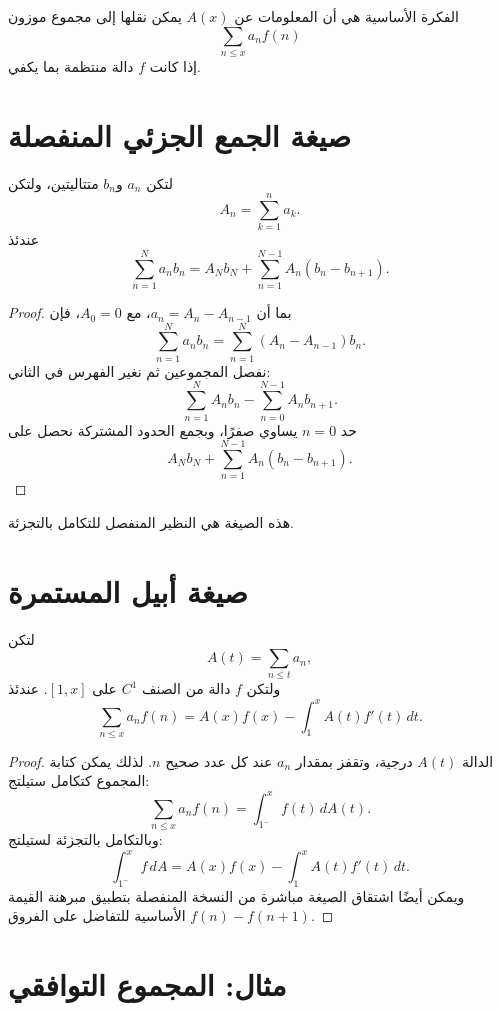 الفكرة الأساسية هي أن المعلومات عن \(A(x)\) يمكن نقلها إلى مجموع موزون
\[
\sum_{n\leq x}a_nf(n)
\]
إذا كانت \(f\) دالة منتظمة بما يكفي.

\section{صيغة الجمع الجزئي المنفصلة}

\begin{theorem}
\label{thm:discrete-partial-summation}
\provedhere
لتكن \(a_n\) و\(b_n\) متتاليتين، ولتكن
\[
A_n=\sum_{k=1}^{n}a_k.
\]
عندئذ
\[
\sum_{n=1}^{N}a_nb_n
=
A_Nb_N
+
\sum_{n=1}^{N-1}A_n(b_n-b_{n+1}).
\]
\end{theorem}

\begin{proof}
بما أن \(a_n=A_n-A_{n-1}\)، مع \(A_0=0\)، فإن
\[
\sum_{n=1}^{N}a_nb_n
=
\sum_{n=1}^{N}(A_n-A_{n-1})b_n.
\]
نفصل المجموعين ثم نغير الفهرس في الثاني:
\[
\sum_{n=1}^{N}A_nb_n
-
\sum_{n=0}^{N-1}A_nb_{n+1}.
\]
حد \(n=0\) يساوي صفرًا، وبجمع الحدود المشتركة نحصل على
\[
A_Nb_N+\sum_{n=1}^{N-1}A_n(b_n-b_{n+1}).
\]
\end{proof}

هذه الصيغة هي النظير المنفصل للتكامل بالتجزئة.

\section{صيغة أبيل المستمرة}

\begin{theorem}
\label{thm:abel-partial-summation}
\provedhere
لتكن
\[
A(t)=\sum_{n\leq t}a_n,
\]
ولتكن \(f\) دالة من الصنف \(C^1\) على \([1,x]\). عندئذ
\[
\sum_{n\leq x}a_nf(n)
=
A(x)f(x)
-
\int_1^x A(t)f'(t)\,dt.
\]
\end{theorem}

\begin{proof}
الدالة \(A(t)\) درجية، وتقفز بمقدار \(a_n\) عند كل عدد صحيح \(n\). لذلك يمكن كتابة المجموع كتكامل ستيلتج:
\[
\sum_{n\leq x}a_nf(n)
=
\int_{1^-}^{x}f(t)\,dA(t).
\]
وبالتكامل بالتجزئة لستيلتج:
\[
\int_{1^-}^{x}f\,dA
=
A(x)f(x)-\int_1^x A(t)f'(t)\,dt.
\]
ويمكن أيضًا اشتقاق الصيغة مباشرة من النسخة المنفصلة بتطبيق مبرهنة القيمة الأساسية للتفاضل على الفروق \(f(n)-f(n+1)\).
\end{proof}

\section{مثال: المجموع التوافقي}

